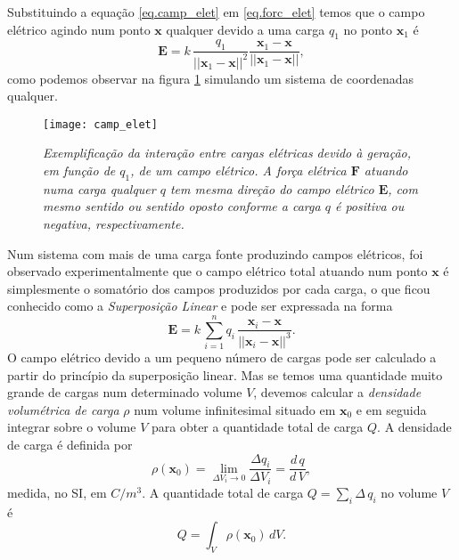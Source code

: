Substituindo a equação \ref{eq.camp_elet} em \ref{eq.forc_elet} temos que o campo elétrico agindo num ponto $\textbf{x}$ qualquer devido a uma carga $q_1$ no ponto $\textbf{x}_1$ é
\begin{equation}\label{eq.campo_eletrico}
\textbf{E}=k\,\frac{q_1}{||\textbf{x}_1-\textbf{x}||^2}\frac{\textbf{x}_1-\textbf{x}}{||\textbf{x}_1-\textbf{x}||},
\end{equation}
como podemos observar na figura \ref{fig.camp_eletr} simulando um sistema de coordenadas qualquer.
\begin{figure}[!htb]
\centering
\texttt{[image: camp\_elet]}
\caption{\textit{Exemplificação da interação entre cargas elétricas devido à geração, em função de $q_1$, de um campo elétrico. A força elétrica $\textbf{F}$ atuando numa carga qualquer $q$ tem mesma direção do campo elétrico $\textbf{E}$, com mesmo sentido ou sentido oposto conforme a carga $q$ é positiva ou negativa, respectivamente.}}
\label{fig.camp_eletr}
\end{figure}


Num sistema com mais de uma carga fonte produzindo campos elétricos, foi observado experimentalmente que o campo elétrico total atuando num ponto $\textbf{x}$ é simplesmente o somatório dos campos produzidos por cada carga, o que ficou conhecido como a \textit{Superposição Linear} e pode ser expressada na forma
\begin{equation*}
\textbf{E}=k\,\sum_{i=1}^{n}q_i\,\frac{\textbf{x}_i-\textbf{x}}{||\textbf{x}_i-\textbf{x}||^3}.
\end{equation*} 
O campo elétrico devido a um pequeno número de cargas pode ser calculado a partir do princípio da superposição linear. Mas se temos uma quantidade muito grande de cargas num determinado volume $V$, devemos calcular a \textit{densidade volumétrica de carga} $\rho$ num volume infinitesimal situado em $\textbf{x}_0$ e em seguida integrar sobre o volume $V$ para obter a quantidade total de carga $Q$. A densidade de carga é definida por
\begin{equation*}
\rho(\textbf{x}_0)=\lim_{\Delta V_i \to 0}\frac{\Delta q_i}{\Delta V_i}=\frac{d\,q}{d\,V},
\end{equation*}
medida, no SI, em $C/m^3$. A quantidade total de carga $Q=\sum_i \Delta\,q_i$ no volume $V$ é
\begin{equation*}
Q=\int_{V}\rho(\textbf{x}_0)\,dV.
\end{equation*}

